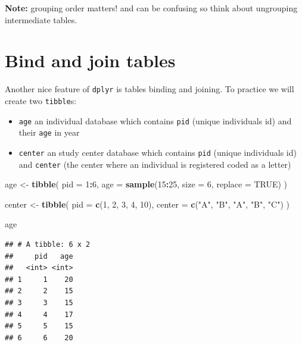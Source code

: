 \documentclass[
]{book}
\newenvironment{Shaded}{\begin{snugshade}}{\end{snugshade}}
\newcommand{\AttributeTok}[1]{\textcolor[rgb]{0.13,0.29,0.53}{#1}}
\newcommand{\ConstantTok}[1]{\textcolor[rgb]{0.56,0.35,0.01}{#1}}
\newcommand{\DecValTok}[1]{\textcolor[rgb]{0.00,0.00,0.81}{#1}}
\newcommand{\FunctionTok}[1]{\textcolor[rgb]{0.13,0.29,0.53}{\textbf{#1}}}
\newcommand{\NormalTok}[1]{#1}
\newcommand{\OtherTok}[1]{\textcolor[rgb]{0.56,0.35,0.01}{#1}}
\newcommand{\SpecialCharTok}[1]{\textcolor[rgb]{0.81,0.36,0.00}{\textbf{#1}}}
\newcommand{\StringTok}[1]{\textcolor[rgb]{0.31,0.60,0.02}{#1}}
\providecommand{\tightlist}{%
  \setlength{\itemsep}{0pt}\setlength{\parskip}{0pt}}
\begin{document}
\textbf{Note:} grouping order matters! and can be confusing so think about ungrouping intermediate tables.

\section{Bind and join tables}\label{bind-and-join-tables}

Another nice feature of \texttt{dplyr} is tables binding and joining. To practice we will create two \texttt{tibble}s:

\begin{itemize}
\tightlist
\item
  \texttt{age} an individual database which contains \texttt{pid} (unique individuals id)
  and their \texttt{age} in year
\item
  \texttt{center} an study center database which contains \texttt{pid} (unique individuals id)
  and \texttt{center} (the center where an individual is registered coded as a letter)
\end{itemize}

\begin{Shaded}
\begin{Highlighting}[]
\NormalTok{age }\OtherTok{\textless{}{-}}
  \FunctionTok{tibble}\NormalTok{(}
    \AttributeTok{pid =} \DecValTok{1}\SpecialCharTok{:}\DecValTok{6}\NormalTok{,}
    \AttributeTok{age =} \FunctionTok{sample}\NormalTok{(}\DecValTok{15}\SpecialCharTok{:}\DecValTok{25}\NormalTok{, }\AttributeTok{size =} \DecValTok{6}\NormalTok{, }\AttributeTok{replace =} \ConstantTok{TRUE}\NormalTok{)}
\NormalTok{  )}

\NormalTok{center }\OtherTok{\textless{}{-}}
  \FunctionTok{tibble}\NormalTok{(}
    \AttributeTok{pid =} \FunctionTok{c}\NormalTok{(}\DecValTok{1}\NormalTok{, }\DecValTok{2}\NormalTok{, }\DecValTok{3}\NormalTok{, }\DecValTok{4}\NormalTok{, }\DecValTok{10}\NormalTok{),}
    \AttributeTok{center =} \FunctionTok{c}\NormalTok{(}\StringTok{"A"}\NormalTok{, }\StringTok{"B"}\NormalTok{, }\StringTok{"A"}\NormalTok{, }\StringTok{"B"}\NormalTok{, }\StringTok{"C"}\NormalTok{)}
\NormalTok{  )}

\NormalTok{age}
\end{Highlighting}
\end{Shaded}

\begin{verbatim}
## # A tibble: 6 x 2
##     pid   age
##   <int> <int>
## 1     1    20
## 2     2    15
## 3     3    15
## 4     4    17
## 5     5    15
## 6     6    20
\end{verbatim}
\end{document}
